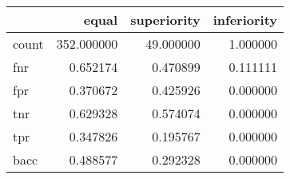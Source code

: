 \begin{tabular}{lrrr}
\toprule
{} &       equal &  superiority &  inferiority \\
\midrule
count &  352.000000 &    49.000000 &     1.000000 \\
fnr   &    0.652174 &     0.470899 &     0.111111 \\
fpr   &    0.370672 &     0.425926 &     0.000000 \\
tnr   &    0.629328 &     0.574074 &     0.000000 \\
tpr   &    0.347826 &     0.195767 &     0.000000 \\
bacc  &    0.488577 &     0.292328 &     0.000000 \\
\bottomrule
\end{tabular}
